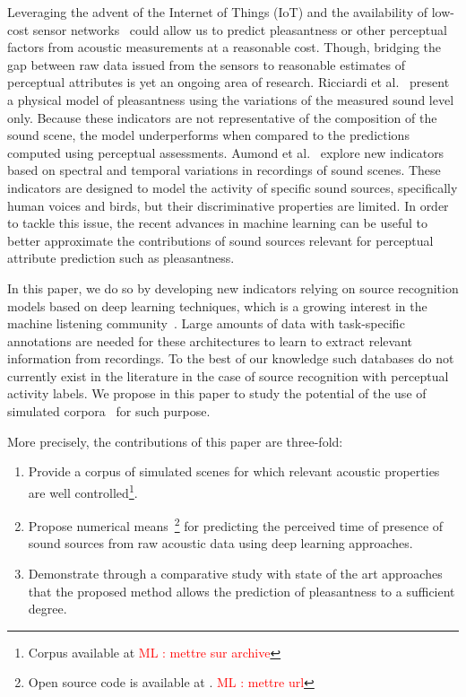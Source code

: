 \documentclass[twocolumn]{article}
\newcommand{\ml}[1]{\textcolor{red}{ML : #1}}
\begin{document}
Leveraging the advent of the Internet of Things (IoT) and the availability of low-cost sensor networks~\cite{ardouin2018, mydlarz2017} could allow us to predict pleasantness or other perceptual factors from acoustic measurements at a reasonable cost. Though, bridging the gap between raw data issued from the sensors to reasonable estimates of perceptual attributes is yet an ongoing area of research. Ricciardi et al.~\cite{ricciardi2014} present a physical model of pleasantness using the variations of the measured sound level only. Because these indicators are not representative of the composition of the sound scene, the model underperforms when compared to the predictions computed using perceptual assessments. Aumond et al.~\cite{aumond2017} explore new indicators based on spectral and temporal variations in recordings of sound scenes. These indicators are designed to model the activity of specific sound sources, specifically human voices and birds, but their discriminative properties are limited. In order to tackle this issue, the recent advances in machine learning can be useful to better approximate the contributions of sound sources relevant for perceptual attribute prediction such as pleasantness.

In this paper, we do so by developing new indicators relying on source recognition models based on deep learning techniques, which is a growing interest in the machine listening community~\cite{cakir2015, salamon2017-2}. Large amounts of data with task-specific annotations are needed for these architectures to learn to extract relevant information from recordings. To the best of our knowledge such databases do not currently exist in the literature in the case of source recognition with perceptual activity labels. We propose in this paper to study the potential of the use of simulated corpora~\cite{lafay2016, salamon2017} for such purpose.

More precisely, the contributions of this paper are three-fold:
\begin{enumerate}
  \item Provide a corpus of simulated scenes for which relevant acoustic properties are well controlled\footnote{Corpus available at \url{} \ml{mettre sur archive}}.
  \item Propose numerical means~\footnote{Open source code is available at \url{}. \ml{mettre url}} for predicting the perceived time of presence of sound sources from raw acoustic data using deep learning approaches.
  \item Demonstrate through a comparative study with state of the art approaches that the proposed method allows the prediction of pleasantness to a sufficient degree.
\end{enumerate}
\end{document}

